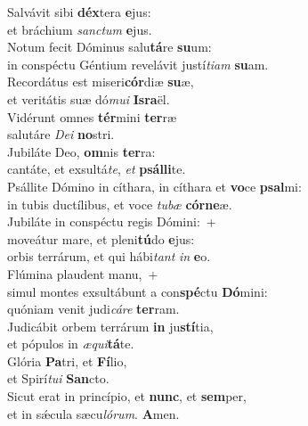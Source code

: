 \evenverse Salvávit sibi \textbf{déx}tera \textbf{e}jus:~\*\\
\evenverse et bráchium \textit{san}\textit{ctum} \textbf{e}jus.\\
\oddverse Notum fecit Dóminus salu\textbf{tá}re \textbf{su}um:~\*\\
\oddverse in conspéctu Géntium revelávit justí\textit{ti}\textit{am} \textbf{su}am.\\
\evenverse Recordátus est miseri\textbf{cór}diæ \textbf{su}æ,~\*\\
\evenverse et veritátis suæ dó\textit{mu}\textit{i} \textbf{Is}\textbf{ra}ël.\\
\oddverse Vidérunt omnes \textbf{tér}mini \textbf{ter}ræ~\*\\
\oddverse salutáre \textit{De}\textit{i} \textbf{no}stri.\\
\evenverse Jubiláte Deo, \textbf{om}nis \textbf{ter}ra:~\*\\
\evenverse cantáte, et exsultá\textit{te}, \textit{et} \textbf{psál}\textbf{li}te.\\
\oddverse Psállite Dómino in cíthara, in cíthara et \textbf{vo}ce \textbf{psal}mi:~\*\\
\oddverse in tubis ductílibus, et voce \textit{tu}\textit{bæ} \textbf{cór}\textbf{ne}æ.\\
\evenverse Jubiláte in conspéctu regis Dómini:~+\\
\evenverse  moveátur mare, et pleni\textbf{tú}do \textbf{e}jus:~\*\\
\evenverse orbis terrárum, et qui hábi\textit{tant} \textit{in} \textbf{e}o.\\
\oddverse Flúmina plaudent manu,~+\\
\oddverse  simul montes exsultábunt a con\textbf{spé}ctu \textbf{Dó}mini:~\*\\
\oddverse quóniam venit judi\textit{cá}\textit{re} \textbf{ter}ram.\\
\evenverse Judicábit orbem terrárum \textbf{in} ju\textbf{stí}tia,~\*\\
\evenverse et pópulos in \textit{æ}\textit{qui}\textbf{tá}te.\\
\oddverse Glória \textbf{Pa}tri, et \textbf{Fí}lio,~\*\\
\oddverse et Spirí\textit{tu}\textit{i} \textbf{San}cto.\\
\evenverse Sicut erat in princípio, et \textbf{nunc}, et \textbf{sem}per,~\*\\
\evenverse et in sǽcula sæcu\textit{ló}\textit{rum}. \textbf{A}men.\\
